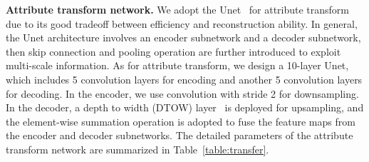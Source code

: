 \documentclass[journal]{IEEEtran}
\begin{document}
\textbf{Attribute transform network.}
We adopt the Unet~\cite{ronneberger2015u} for attribute transform due to its good tradeoff between efficiency and reconstruction ability.
In general, the Unet architecture involves an encoder subnetwork and a decoder subnetwork, then skip connection and pooling operation are further introduced to exploit multi-scale information.
As for attribute transform, we design a 10-layer Unet, which includes 5 convolution layers for encoding and another 5 convolution layers for decoding.
In the encoder, we use convolution with stride 2 for downsampling.
In the decoder, a depth to width (DTOW) layer~\cite{shi2016real} is deployed for upsampling, and the element-wise summation operation is adopted to fuse the feature maps from the encoder and decoder subnetworks.
The detailed parameters of the attribute transform network are summarized in Table~\ref{table:transfer}.
\end{document}
